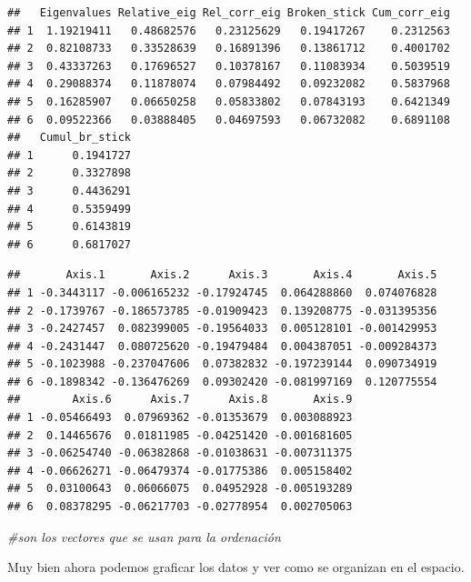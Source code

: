 \documentclass[]{book}
\newenvironment{Shaded}{\begin{snugshade}}{\end{snugshade}}
\newcommand{\KeywordTok}[1]{\textcolor[rgb]{0.13,0.29,0.53}{\textbf{{#1}}}}
\newcommand{\CommentTok}[1]{\textcolor[rgb]{0.56,0.35,0.01}{\textit{{#1}}}}
\newcommand{\NormalTok}[1]{{#1}}
\begin{document}
\begin{verbatim}
##   Eigenvalues Relative_eig Rel_corr_eig Broken_stick Cum_corr_eig
## 1  1.19219411   0.48682576   0.23125629   0.19417267    0.2312563
## 2  0.82108733   0.33528639   0.16891396   0.13861712    0.4001702
## 3  0.43337263   0.17696527   0.10378167   0.11083934    0.5039519
## 4  0.29088374   0.11878074   0.07984492   0.09232082    0.5837968
## 5  0.16285907   0.06650258   0.05833802   0.07843193    0.6421349
## 6  0.09522366   0.03888405   0.04697593   0.06732082    0.6891108
##   Cumul_br_stick
## 1      0.1941727
## 2      0.3327898
## 3      0.4436291
## 4      0.5359499
## 5      0.6143819
## 6      0.6817027
\end{verbatim}

\begin{Shaded}
\end{Shaded}

\begin{verbatim}
##       Axis.1       Axis.2      Axis.3       Axis.4       Axis.5
## 1 -0.3443117 -0.006165232 -0.17924745  0.064288860  0.074076828
## 2 -0.1739767 -0.186573785 -0.01909423  0.139208775 -0.031395356
## 3 -0.2427457  0.082399005 -0.19564033  0.005128101 -0.001429953
## 4 -0.2431447  0.080725620 -0.19479484  0.004387051 -0.009284373
## 5 -0.1023988 -0.237047606  0.07382832 -0.197239144  0.090734919
## 6 -0.1898342 -0.136476269  0.09302420 -0.081997169  0.120775554
##        Axis.6      Axis.7      Axis.8       Axis.9
## 1 -0.05466493  0.07969362 -0.01353679  0.003088923
## 2  0.14465676  0.01811985 -0.04251420 -0.001681605
## 3 -0.06254740 -0.06382868 -0.01038631 -0.007311375
## 4 -0.06626271 -0.06479374 -0.01775386  0.005158402
## 5  0.03100643  0.06066075  0.04952928 -0.005193289
## 6  0.08378295 -0.06217703 -0.02778954  0.002705063
\end{verbatim}

\begin{Shaded}
\begin{Highlighting}[]
\CommentTok{#son los vectores que se usan para la ordenación }
\end{Highlighting}
\end{Shaded}

Muy bien ahora podemos graficar los datos y ver como se organizan en el
espacio.
\end{document}
